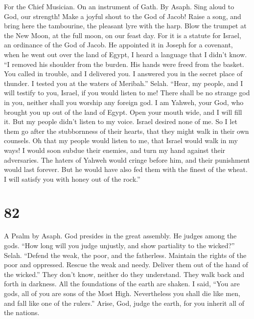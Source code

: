 For the Chief Musician. On an instrument of Gath. By Asaph.
 Sing aloud to God, our strength! Make a joyful shout to
the God of Jacob!  Raise a song, and bring here the
tambourine, the pleasant lyre with the harp.  Blow the
trumpet at the New Moon, at the full moon, on our feast day.
 For it is a statute for Israel, an ordinance of the God
of Jacob.  He appointed it in Joseph for a covenant, when
he went out over the land of Egypt, I heard a language that I didn't
know.  ``I removed his shoulder from the burden. His hands
were freed from the basket.  You called in trouble, and I
delivered you. I answered you in the secret place of thunder. I tested
you at the waters of Meribah.'' Selah.  ``Hear, my people,
and I will testify to you, Israel, if you would listen to me!
 There shall be no strange god in you, neither shall you
worship any foreign god.  I am Yahweh, your God, who
brought you up out of the land of Egypt. Open your mouth wide, and I
will fill it.  But my people didn't listen to my voice.
Israel desired none of me.  So I let them go after the
stubbornness of their hearts, that they might walk in their own
counsels.  Oh that my people would listen to me, that
Israel would walk in my ways!  I would soon subdue their
enemies, and turn my hand against their adversaries.  The
haters of Yahweh would cringe before him, and their punishment would
last forever.  But he would have also fed them with the
finest of the wheat. I will satisfy you with honey out of the rock.''

\hypertarget{section-74}{%
\section{82}\label{section-74}}

A Psalm by Asaph.  God presides in the great assembly. He
judges among the gods.  ``How long will you judge
unjustly, and show partiality to the wicked?'' Selah. 
``Defend the weak, the poor, and the fatherless. Maintain the rights of
the poor and oppressed.  Rescue the weak and needy.
Deliver them out of the hand of the wicked.''  They don't
know, neither do they understand. They walk back and forth in darkness.
All the foundations of the earth are shaken.  I said,
``You are gods, all of you are sons of the Most High. 
Nevertheless you shall die like men, and fall like one of the rulers.''
 Arise, God, judge the earth, for you inherit all of the
nations.


